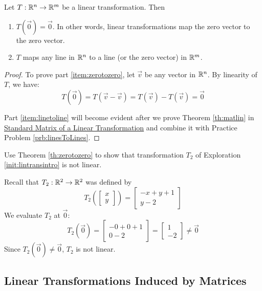 \documentclass{ximera}
\begin{document}
\begin{theorem}\label{th:zerotozero} Let $T:\mathbb{R}^n\rightarrow \mathbb{R}^m$ be a linear transformation.  Then 
\begin{enumerate}
\item\label{item:zerotozero}
$T(\vec{0})=\vec{0}$.  In other words, linear transformations map the zero vector to the zero vector.
\item\label{item:linetoline}
$T$ maps any line in $\mathbb{R}^n$ to a line (or the zero vector) in $\mathbb{R}^m$.
\end{enumerate}
\end{theorem}
\begin{proof}
To prove part \ref{item:zerotozero}, let $\vec{v}$ be any vector in $\mathbb{R}^n$.  By linearity of $T$, we have:
$$T(\vec{0})=T(\vec{v}-\vec{v})=T(\vec{v})-T(\vec{v})=\vec{0}$$

Part \ref{item:linetoline} will become evident after we prove Theorem \ref{th:matlin} in \href{https://ximera.osu.edu/linearalgebradzv3/LinearAlgebraInteractiveIntro/LTR-0020/main}{Standard Matrix of a Linear Transformation} and combine it with Practice Problem \ref{prb:linesToLines}.
\end{proof}

\begin{example}\label{ex:zerotozero}
Use Theorem \ref{th:zerotozero} to show that transformation $T_2$ of Exploration \ref{init:lintransintro} is not linear.
\begin{explanation}
Recall that $T_2:\mathbb{R}^2\rightarrow\mathbb{R}^2$ was defined by
$$T_2\left(\begin{bmatrix}
x\\
y
\end{bmatrix}\right)=\begin{bmatrix}
-x+y+1\\
y-2
\end{bmatrix}$$
We evaluate $T_2$ at $\vec{0}$:
$$T_2(\vec{0})=\begin{bmatrix}
-0+0+1\\
0-2
\end{bmatrix}=\begin{bmatrix}1\\-2\end{bmatrix}\neq\vec{0}$$
Since $T_2(\vec{0})\neq\vec{0}$, $T_2$ is not linear.
\end{explanation}
\end{example}




\subsection*{Linear Transformations Induced by Matrices}
\end{document}
